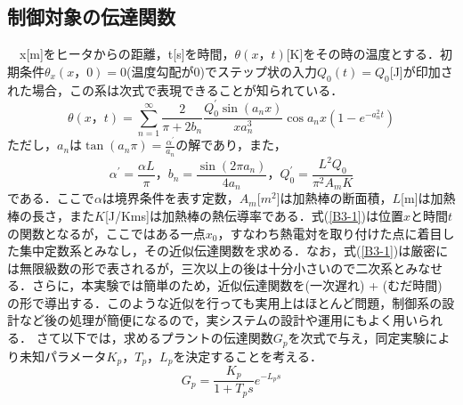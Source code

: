 \documentclass[12pt]{jsarticle}
\begin{document}
\subsection{制御対象の伝達関数}
　x[m]をヒータからの距離，t[s]を時間，$\theta(x，t)$[K]をその時の温度とする．初期条件$\theta_x(x，0)=0$(温度勾配が0)でステップ状の入力$Q_0(t)=Q_0$[J]が印加された場合，この系は次式で表現できることが知られている．
\begin{equation}
  \label{B3-1}
  \theta(x，t) = \sum_{n=1}^{\infty}\frac{2}{\pi+2b_n}\frac{Q_0^{\prime}\sin(a_nx)}{xa_n^3}\cos{a_nx(1-e^{-a_n^2t})}
\end{equation}
ただし，$a_n$は$\tan(a_n\pi) = \frac{\alpha^{\prime}}{a_n}$の解であり，また，
\begin{displaymath}
  \alpha^{\prime} = \frac{\alpha L}{\pi}， b_n = \frac{\sin(2\pi a_n)}{4a_n}， Q_0^{\prime} = \frac{L^2Q_0}{\pi^2A_mK}
\end{displaymath}
である．ここで$\alpha$は境界条件を表す定数，$A_m$[$m^2$]は加熱棒の断面積，$L$[m]は加熱棒の長さ，また$K$[J/Kms]は加熱棒の熱伝導率である．式(\ref{B3-1})は位置$x$と時間$t$の関数となるが，ここではある一点$x_0$，すなわち熱電対を取り付けた点に着目した集中定数系とみなし，その近似伝達関数を求める．なお，式(\ref{B3-1})は厳密には無限級数の形で表されるが，三次以上の後は十分小さいので二次系とみなせる．さらに，本実験では簡単のため，近似伝達関数を(一次遅れ) + (むだ時間) の形で導出する．このような近似を行っても実用上はほとんど問題，制御系の設計など後の処理が簡便になるので，実システムの設計や運用にもよく用いられる．
さて以下では，求めるプラントの伝達関数$G_p$を次式で与え，同定実験により未知パラメータ$K_p$，$T_p$，$L_p$を決定することを考える．
\begin{equation}
  \label{B3-2}
  G_p = \frac{K_p}{1+T_ps}e^{-L_ps}
\end{equation}
\end{document}
